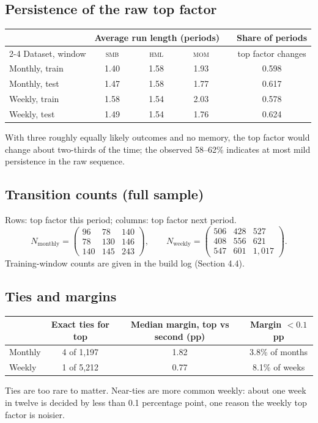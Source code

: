 \documentclass[11pt]{article}
\newcommand{\SMB}{\textsc{smb}}
\newcommand{\HML}{\textsc{hml}}
\newcommand{\MOM}{\textsc{mom}}
\begin{document}
\subsection{Persistence of the raw top factor}
\begin{center}
\begin{tabular}{l ccc c c}
\toprule
 & \multicolumn{3}{c}{Average run length (periods)} && Share of periods \\
\cmidrule{2-4}
Dataset, window & \SMB & \HML & \MOM && top factor changes \\
\midrule
Monthly, train & 1.40 & 1.58 & 1.93 && 0.598 \\
Monthly, test & 1.47 & 1.58 & 1.77 && 0.617 \\
Weekly, train & 1.58 & 1.54 & 2.03 && 0.578 \\
Weekly, test & 1.49 & 1.54 & 1.76 && 0.624 \\
\bottomrule
\end{tabular}
\end{center}
With three roughly equally likely outcomes and no memory, the top factor would change about two-thirds of the time; the observed 58--62\% indicates at most mild persistence in the raw sequence.

\subsection{Transition counts (full sample)}
Rows: top factor this period; columns: top factor next period.
\[
N_{\text{monthly}}=
\begin{pmatrix}
96 & 78 & 140\\
78 & 130 & 146\\
140 & 145 & 243
\end{pmatrix},
\qquad
N_{\text{weekly}}=
\begin{pmatrix}
506 & 428 & 527\\
408 & 556 & 621\\
547 & 601 & 1{,}017
\end{pmatrix}.
\]
Training-window counts are given in the build log (Section 4.4).

\subsection{Ties and margins}
\begin{center}
\begin{tabular}{lccc}
\toprule
 & Exact ties for top & Median margin, top vs second (pp) & Margin $<0.1$ pp \\
\midrule
Monthly & 4 of 1{,}197 & 1.82 & 3.8\% of months \\
Weekly & 1 of 5{,}212 & 0.77 & 8.1\% of weeks \\
\bottomrule
\end{tabular}
\end{center}
Ties are too rare to matter. Near-ties are more common weekly: about one week in twelve is decided by less than 0.1 percentage point, one reason the weekly top factor is noisier.
\end{document}
